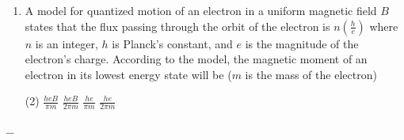 \documentclass[preview, border={10mm, 5mm, 10mm, 10mm}]{standalone}
\title{\textsc{}}
\begin{document}
\begin{enumerate}[leftmargin=*]
\item[$\Omega.$] A model for quantized motion of an electron in a uniform magnetic field $B$ states that the flux passing through the orbit of the electron is $n\left(\frac{h}{e}\right)$ where $n$ is an integer, $h$ is Planck's constant, and $e$ is the magnitude of the electron's charge. According to the model, the magnetic moment of an electron in its lowest energy state will be ($m$ is the mass of the electron)
\begin{tasks}(2)
    \task $\frac{heB}{\pi m}$
    \task $\frac{heB}{2\pi m}$
    \task $\frac{he}{\pi m}$
    \task $\frac{he}{2\pi m}$ 
\end{tasks}
\end{enumerate}
\hfill $\_\_$
\end{document}
